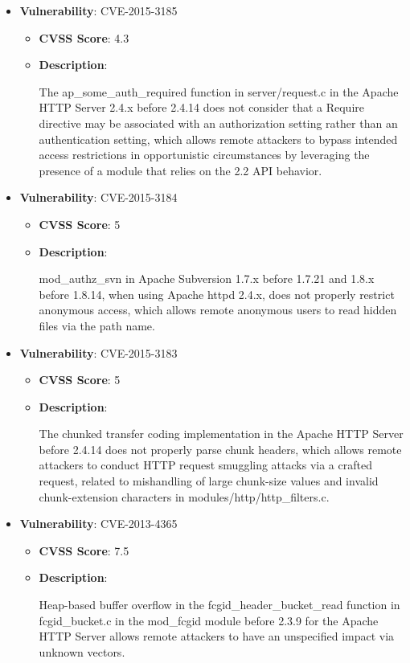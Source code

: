 \documentclass{article}
\begin{document}
\begin{itemize}
        \item \textbf{Vulnerability}: CVE-2015-3185
        \begin{itemize}
            \item \textbf{CVSS Score}:  4.3 
            \item \textbf{Description}:
            \parbox[t]{0.9\linewidth}{
                \ttfamily The ap\_some\_auth\_required function in server/request.c in the Apache HTTP Server 2.4.x before 2.4.14 does not consider that a Require directive may be associated with an authorization setting rather than an authentication setting, which allows remote attackers to bypass intended access restrictions in opportunistic circumstances by leveraging the presence of a module that relies on the 2.2 API behavior.
            }
        \end{itemize}
    
        \item \textbf{Vulnerability}: CVE-2015-3184
        \begin{itemize}
            \item \textbf{CVSS Score}:  5 
            \item \textbf{Description}:
            \parbox[t]{0.9\linewidth}{
                \ttfamily mod\_authz\_svn in Apache Subversion 1.7.x before 1.7.21 and 1.8.x before 1.8.14, when using Apache httpd 2.4.x, does not properly restrict anonymous access, which allows remote anonymous users to read hidden files via the path name.
            }
        \end{itemize}
    
        \item \textbf{Vulnerability}: CVE-2015-3183
        \begin{itemize}
            \item \textbf{CVSS Score}:  5 
            \item \textbf{Description}:
            \parbox[t]{0.9\linewidth}{
                \ttfamily The chunked transfer coding implementation in the Apache HTTP Server before 2.4.14 does not properly parse chunk headers, which allows remote attackers to conduct HTTP request smuggling attacks via a crafted request, related to mishandling of large chunk-size values and invalid chunk-extension characters in modules/http/http\_filters.c.
            }
        \end{itemize}
    
        \item \textbf{Vulnerability}: CVE-2013-4365
        \begin{itemize}
            \item \textbf{CVSS Score}:  7.5 
            \item \textbf{Description}:
            \parbox[t]{0.9\linewidth}{
                \ttfamily Heap-based buffer overflow in the fcgid\_header\_bucket\_read function in fcgid\_bucket.c in the mod\_fcgid module before 2.3.9 for the Apache HTTP Server allows remote attackers to have an unspecified impact via unknown vectors.
            }
        \end{itemize}
    

\end{itemize}
\end{document}
